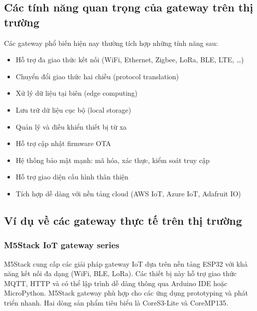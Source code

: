         \subsection{Các tính năng quan trọng của gateway trên thị trường}
            Các gateway phổ biến hiện nay thường tích hợp những tính năng sau:
            \begin{itemize}
                \item Hỗ trợ đa giao thức kết nối (WiFi, Ethernet, Zigbee, LoRa, BLE, LTE, \ldots)
                \item Chuyển đổi giao thức hai chiều (protocol translation)
                \item Xử lý dữ liệu tại biên (edge computing)
                \item Lưu trữ dữ liệu cục bộ (local storage)
                \item Quản lý và điều khiển thiết bị từ xa
                \item Hỗ trợ cập nhật firmware OTA
                \item Hệ thống bảo mật mạnh: mã hóa, xác thực, kiểm soát truy cập
                \item Hỗ trợ giao diện cấu hình thân thiện
                \item Tích hợp dễ dàng với nền tảng cloud (AWS IoT, Azure IoT, Adafruit IO)
            \end{itemize}
        \subsection{Ví dụ về các gateway thực tế trên thị trường}
            \subsubsection*{M5Stack IoT gateway series}
                M5Stack cung cấp các giải pháp gateway IoT dựa trên nền tảng ESP32 với khả năng kết nối đa dạng (WiFi, BLE, LoRa). Các thiết bị này hỗ trợ giao thức MQTT, HTTP và có thể lập trình dễ dàng thông qua Arduino IDE hoặc MicroPython. M5Stack gateway phù hợp cho các ứng dụng prototyping và phát triển nhanh. Hai dòng sản phẩm tiêu biểu là CoreS3-Lite và CoreMP135.
